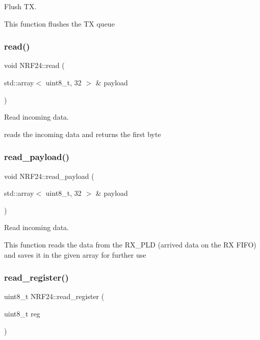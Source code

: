 Flush TX. 

This function flushes the TX queue \mbox{\label{classNRF24_a30b979af4d98047b48b2895c6eeb2116}} 
\subsubsection{\texorpdfstring{read()}{read()}}
{\footnotesize\ttfamily void N\+R\+F24\+::read (\begin{DoxyParamCaption}\item[{std\+::array$<$ uint8\+\_\+t, 32 $>$ \&}]{payload }\end{DoxyParamCaption})}



Read incoming data. 

reads the incoming data and returns the first byte \mbox{\label{classNRF24_a3ad77490f14987e7349425799d40207e}} 
\subsubsection{\texorpdfstring{read\+\_\+payload()}{read\_payload()}}
{\footnotesize\ttfamily void N\+R\+F24\+::read\+\_\+payload (\begin{DoxyParamCaption}\item[{std\+::array$<$ uint8\+\_\+t, 32 $>$ \&}]{payload }\end{DoxyParamCaption})\hspace{0.3cm}{\ttfamily [protected]}}



Read incoming data. 

This function reads the data from the R\+X\+\_\+\+P\+LD (arrived data on the RX F\+I\+FO) and saves it in the given array for further use \mbox{\label{classNRF24_abaddce712f45103e2ba5c7dd469d0f43}} 
\subsubsection{\texorpdfstring{read\+\_\+register()}{read\_register()}\hspace{0.1cm}{\footnotesize\ttfamily [1/2]}}
{\footnotesize\ttfamily uint8\+\_\+t N\+R\+F24\+::read\+\_\+register (\begin{DoxyParamCaption}\item[{uint8\+\_\+t}]{reg }\end{DoxyParamCaption})\hspace{0.3cm}{\ttfamily [protected]}}



